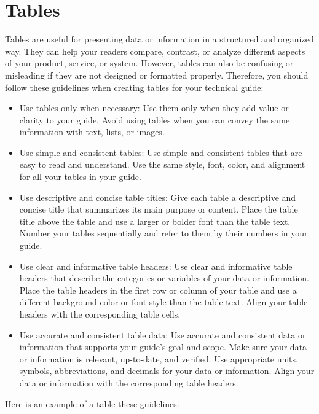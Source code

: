 \documentclass[12pt]{article}
\begin{document}
\pagebreak

\section{Tables}

Tables are useful for presenting data or information in a structured and organized way. They can help your readers compare, contrast, or analyze different aspects of your product, service, or system. However, tables can also be confusing or misleading if they are not designed or formatted properly. Therefore, you should follow these guidelines when creating tables for your technical guide:

\begin{itemize}
    \item Use tables only when necessary: Use them only when they add value or clarity to your guide. Avoid using tables when you can convey the same information with text, lists, or images.
    \item Use simple and consistent tables: Use simple and consistent tables that are easy to read and understand. Use the same style, font, color, and alignment for all your tables in your guide.
    \item Use descriptive and concise table titles: Give each table a descriptive and concise title that summarizes its main purpose or content. Place the table title above the table and use a larger or bolder font than the table text. Number your tables sequentially and refer to them by their numbers in your guide.
    \item Use clear and informative table headers: Use clear and informative table headers that describe the categories or variables of your data or information. Place the table headers in the first row or column of your table and use a different background color or font style than the table text. Align your table headers with the corresponding table cells.
    \item Use accurate and consistent table data: Use accurate and consistent data or information that supports your guide's goal and scope. Make sure your data or information is relevant, up-to-date, and verified. Use appropriate units, symbols, abbreviations, and decimals for your data or information. Align your data or information with the corresponding table headers.
\end{itemize}

Here is an example of a table these guidelines:
\end{document}
